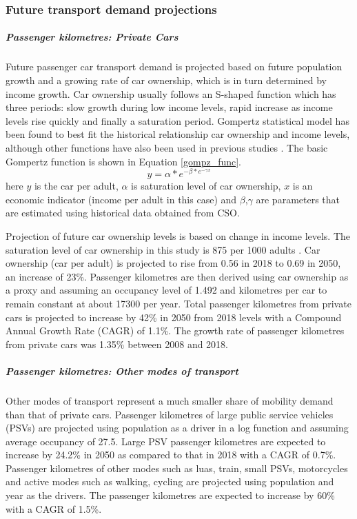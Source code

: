 \documentclass[gmd,manuscript]{copernicus}
\begin{document}
\subsubsection{Future transport demand projections}
\subparagraph{Passenger kilometres: Private Cars}
Future passenger car transport demand is projected based on future population growth and a growing rate of car ownership, which is in turn determined by income growth. Car ownership usually follows an S-shaped function which has three periods: slow growth during low income levels, rapid increase as income levels rise quickly and finally a saturation period. Gompertz statistical model has been found to best fit the historical relationship car ownership and income levels, although other functions have also been used in previous studies \citep{Lian2018}. The basic Gompertz function is shown in Equation \ref{gompz_func}.
\begin{equation}
\label{gompz_func}
 y=\alpha*e^{-\beta*e^{-\gamma x}}
\end{equation}
here $y$ is the car per adult, $\alpha$ is saturation level of car ownership, $x$ is an economic indicator (income per adult in this case) and $\beta$,$\gamma$ are parameters that are estimated using historical data obtained from CSO. 

Projection of future car ownership levels is based on change in income levels. The saturation level of car ownership in this study is 875 per 1000 adults \citep{AECOMIrelandLimited2019}. Car ownership (car per adult) is projected to rise from 0.56 in 2018 to 0.69 in 2050, an increase of 23\%. Passenger kilometres are then derived using car ownership as a proxy and assuming an occupancy level of 1.492 and kilometres per car to remain constant at about 17300 per year. Total passenger kilometres from private cars is projected to increase by 42\% in 2050 from 2018 levels with a Compound Annual Growth Rate (CAGR) of 1.1\%. The growth rate of passenger kilometres from private cars was 1.35\% between 2008 and 2018. 

\subparagraph{Passenger kilometres: Other modes of transport}
Other modes of transport represent a much smaller share of mobility demand than that of private cars. Passenger kilometres of large public service vehicles (PSVs) are projected using population as a driver in a log function and assuming average occupancy of 27.5. Large PSV passenger kilometres are expected to increase by 24.2\% in 2050 as compared to that in 2018 with a CAGR of 0.7\%. Passenger kilometres of other modes such as luas, train, small PSVs, motorcycles and active modes such as walking, cycling are projected using population and year as the drivers. The passenger kilometres are expected to increase by 60\% with a CAGR of 1.5\%. 
\end{document}
